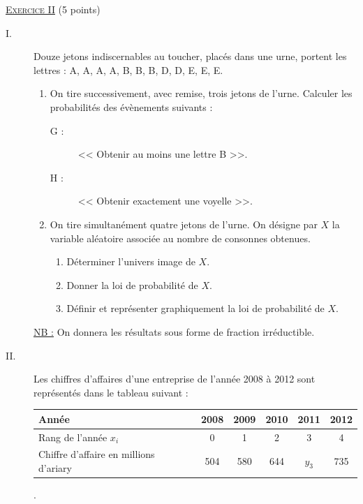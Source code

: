 \noindent \underline{\textsc{Exercice II}} (5 points) 
      \begin{description}
            \item[I.]
	                  Douze jetons indiscernables au toucher, plac\'es dans une urne, portent les lettres : 
                  A, A, A, A, B, B, B, D, D, E, E, E.
                  \begin{enumerate}
                        \item On tire successivement, avec remise, trois jetons de l'urne.
	                              Calculer les probabilit\'es des \'ev\`enements suivants : 
                              \begin{description}
                                    \item[G :] << Obtenir au moins une lettre B >>.
                                    \item[H :] << Obtenir exactement une voyelle >>.
                              \end{description}
	                        \item On tire simultan\'ement quatre jetons de l'urne.
                              On d\'esigne par $X$ la variable al\'eatoire associ\'ee au nombre de consonnes obtenues.
                              \begin{enumerate}
                                    \item D\'eterminer l'univers image de $X$.
                                    \item Donner la loi de probabilit\'e de $X$.
                                    \item D\'efinir et repr\'esenter graphiquement la loi de probabilit\'e de $X$.
                              \end{enumerate}
                  \end{enumerate}
	                  \underline{NB :} On donnera les r\'esultats sous forme de fraction irr\'eductible.
            \item[II.]
                  Les chiffres d'affaires d'une entreprise de l'ann\'ee 2008 \`a 2012 
                  sont repr\'esent\'es dans le tableau suivant : \newline
                  \begin{tabular}[b]{|p{20ex}|c|c|c|c|c|}
                  \hline 
                  Ann\'ee & 2008 & 2009 & 2010 & 2011 & 2012 \\ 
                  \hline 
                  Rang de l'ann\'ee $x_i$ & 0 & 1 & 2 & 3 & 4 \\ 
                  \hline 
                  Chiffre d'affaire en millions d'ariary & 504 & 580 & 644 & $y_3$ & 735 \\ 
                  \hline 
                  \end{tabular}.
                  

\end{description}
